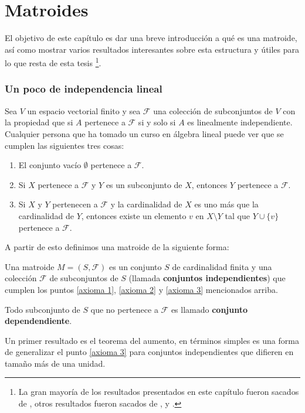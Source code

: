 \chapter{Matroides}

El objetivo de este capítulo es dar una breve introducción a qué es una matroide, así como mostrar varios resultados interesantes sobre esta estructura y útiles para lo que resta de esta tesis \footnote{La gran mayoría de los resultados presentados en este capítulo fueron sacados de \cite{matroid}, otros resultados fueron sacados de \cite{CO1}, \cite{CO2} y \cite{CO3}.}.

\subsection*{Un poco de independencia lineal}
Sea $V$ un espacio vectorial finito y sea $\mathcal{F}$ una colección de subconjuntos de $V$ con la propiedad que si $A$ pertenece a $\mathcal{F}$ si y solo si $A$ es linealmente independiente. Cualquier persona que ha tomado un curso en álgebra lineal puede ver que se cumplen las siguientes tres cosas: 
\begin{enumerate}
\item El conjunto vacío $\emptyset$ pertenece a $\mathcal{F}$. \label{axioma 1}
\item Si $X$ pertenece a $\mathcal{F}$ y $Y$ es un subconjunto de $X$, entonces $Y$ pertenece a $\mathcal{F}$. \label{axioma 2}
\item Si $X$ y $Y$ pertenecen a $\mathcal{F}$ y la cardinalidad de $X$ es uno más que la cardinalidad de $Y$, entonces existe un elemento $v$ en $X \setminus Y$ tal que $Y \cup \{v\} $ pertenece a $\mathcal{F}$. \label{axioma 3}
\end{enumerate}

A partir de esto definimos una matroide de la siguiente forma:
\begin{dfn}
Una matroide $M=(S, \mathcal{F})$ es un conjunto $S$ de cardinalidad finita y una colección $\mathcal{F}$ de subconjuntos de $S$ (llamada \textbf{conjuntos independientes}) que cumplen los puntos \ref{axioma 1}, \ref{axioma 2} y \ref{axioma 3} mencionados arriba. 

Todo subconjunto de $S$ que no pertenece a $\mathcal{F}$ es llamado \textbf{conjunto dependendiente}.
\end{dfn}


Un primer resultado es el teorema del aumento, en términos simples es una forma de generalizar el punto \ref{axioma 3} para conjuntos independientes que difieren en tamaño más de una unidad. 

